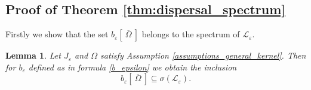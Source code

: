 \documentclass[12pt, a4paper]{article}
\theoremstyle{break}
\theoremstyle{break}
\theoremstyle{break}
\theoremstyle{break}
\newtheorem{lem}{Lemma}[section]
\theoremstyle{break}
\newcommand{\Leo}{\mathcal{L}_{\varepsilon}}
\begin{document}
\subsection{Proof of Theorem \ref{thm:dispersal_spectrum}}

Firstly we show that the set $b_\varepsilon \left[\: \overline{\Omega} \:\right]$ belongs to the spectrum of $\Leo$.

\begin{lem} \label{lem:spectrum_inclusion}
    Let $J_\varepsilon$ and $\Omega$ satisfy Assumption \ref{assumptions_general_kernel}. Then for $b_\varepsilon$ defined as in formula \eqref{b_epsilon} we obtain the inclusion
    \begin{equation*}
        b_\varepsilon\left[\:\overline{\Omega}\:\right] \subseteq \sigma(\Leo).
    \end{equation*}
\end{lem} 
\end{document}
